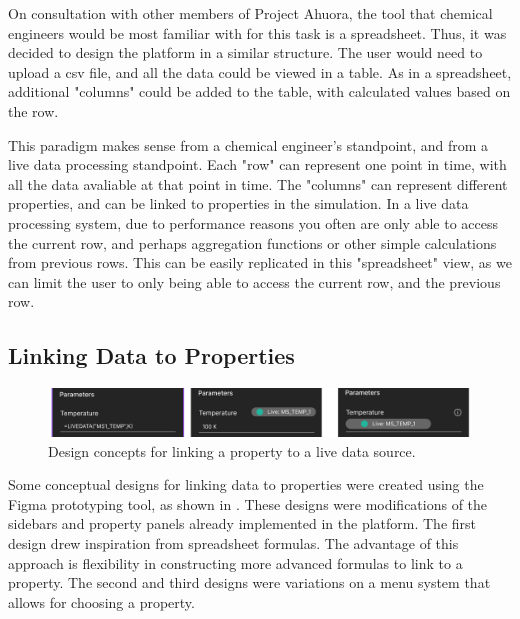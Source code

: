 
On consultation with other members of Project Ahuora, the tool that chemical engineers would be most familiar with for this task is a spreadsheet. 
Thus, it was decided to design the platform in a similar structure. The user would need to upload a csv file, and all the data could be viewed in a table. 
As in a spreadsheet, additional "columns" could be added to the table, with calculated values based on the row.

This paradigm makes sense from a chemical engineer's standpoint, and from a live data processing standpoint. Each "row" can represent one point in time, with all the data avaliable at that point in time. The "columns" can represent different properties, and can be linked to properties in the simulation. In a live data processing system, due to performance reasons you often are only able to access the current row, and perhaps aggregation functions or other simple calculations from previous rows. This can be easily replicated in this "spreadsheet" view, as we can limit the user to only being able to access the current row, and the previous row.


\subsection{Linking Data to Properties}

\begin{figure}[h]
    \centering
    \includegraphics[width=\textwidth]{live_data_design_ideas.png}
    \caption{Design concepts for linking a property to a live data source.}
    \label{fig:linking_designs}
\end{figure}

Some conceptual designs for linking data to properties were created using the Figma prototyping tool, as shown in . These designs were modifications of the sidebars and property panels already implemented in the platform. The first design drew inspiration from spreadsheet formulas. The advantage of this approach is flexibility in constructing more advanced formulas to link to a property. The second and third designs were variations on a menu system that allows for choosing a property. 

